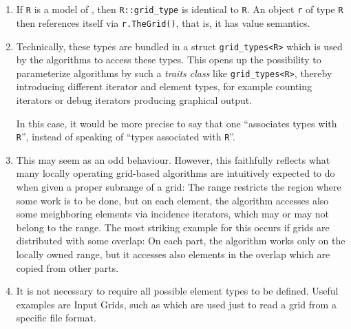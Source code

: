      ~
    \W\\
     ~
    \W\\

    \begin{enumerate}
    \item       {}
      If {\tt  R} is a model of
      ,
      then {\tt  R::grid\_type} is identical to {\tt  R}.
      An object {\tt  r} of type {\tt R} 
      then references itself via {\tt  r.TheGrid()}, 
      that is, it has value semantics.
          
      \item   {}
        Technically, these types are bundled in a struct {\tt  grid\_types<R>}
      which is used by the algorithms to access these types. This opens up the possibility
      to parameterize algorithms by such a {\em  traits class} like {\tt  grid\_types<R>},
      thereby introducing different iterator and element types, for example counting iterators
      or debug iterators producing graphical output.
    
      In this case, it would be more precise to say that one 
      ``associates types with {\tt  R}'', 
      instead of speaking of ``types associated with {\tt  R}''.

      
      \item {}
        This may seem as an odd behaviour. However, this faithfully reflects what many
      locally operating grid-based algorithms are intuitively expected to do when
      given a proper subrange of a grid: The range restricts the region where some
      work is to be done, but on each element, the algorithm accesses also some
      meighboring elements via incidence iterators, which may or may not belong to the
      range. The most striking example for this occurs if grids are distributed with
      some overlap: On each part, the algorithm works only on the locally owned range, 
      but it accesses also elements in the overlap which are copied from other parts.

     
      \item 
        It is not necessary to require all possible element types to be defined.
      Useful examples are Input Grids, 
      such as   
      which are used just to read a grid from
      a specific file format.
    \end{enumerate}

     ~
     ~
     ~


